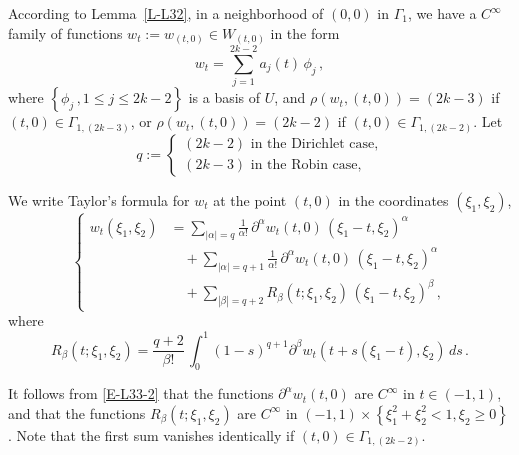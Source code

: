 \documentclass[12pt,a4paper]{amsart}
\theoremstyle{plain} %
\theoremstyle{definition}
\numberwithin{equation}{section}
\numberwithin{figure}{section}
\numberwithin{table}{section}
\newcommand{\set}[1]{\left\lbrace #1 \right\rbrace}
\begin{document}
According to Lemma~\ref{L-L32}, in a neighborhood  of $ (0,0)$ in $ \Gamma_1$, we have a $C^{\infty}$ family of functions $ w_t := w_{(t,0) }\in W_{(t,0)}$ in the form
%
\begin{equation}\label{E-L33-2}
w_t = \sum_{j=1}^{2k-2} a_j(t) \, \phi_j\,,
\end{equation}
%
where $\set{\phi_j\,, 1 \le j \le 2k-2}$ is a basis of $U$, and $\rho(w_t,(t,0)) = (2k-3)$ if $(t,0) \in \Gamma_{1,(2k-3)}$, or $\rho(w_t,(t,0)) = (2k-2)$ if $(t,0) \in \Gamma_{1,(2k-2)}$. Let
%
\begin{equation*}%
q := \left\{
        \begin{array}{l}
          (2k-2) \text{~in the Dirichlet case,}\\[5pt]
          (2k-3) \text{~in the Robin case,}
        \end{array}
      \right.
\end{equation*}

We write Taylor's formula for $w_t$ at the point $(t,0)$ in the coordinates $(\xi_1,\xi_2)$,
%
\begin{equation}\label{E-L33-6}
\left\{
\begin{array}{ll}
w_t(\xi_1,\xi_2) & = \sum_{|\alpha| = q} \frac{1}{\alpha!} \, \partial^{\alpha}w_t(t,0) \, \left( \xi_1 - t, \xi_2\right)^{\alpha}\\[5pt]
&\quad  + \sum_{|\alpha| = q+1} \frac{1}{\alpha!} \, \partial^{\alpha}w_t(t,0) \, \left( \xi_1 - t, \xi_2\right)^{\alpha}\\[5pt]
&\quad  + \sum_{|\beta| = q+2} R_{\beta}(t;\xi_1,\xi_2)\, \left( \xi_1 - t, \xi_2\right)^{\beta}\,,
\end{array}
\right.
\end{equation}
%
where
%
\begin{equation*}
R_{\beta}(t;\xi_1,\xi_2) = \frac{q+2}{\beta!} \,\int_0^1 (1-s)^{q+1} \partial^{\beta}w_t\left( t + s(\xi_1-t),\xi_2\right) \, ds\,.
\end{equation*}

It follows from \eqref{E-L33-2} that the functions $\partial^{\alpha}w_t(t,0)$ are $C^{\infty}$ in $t \in (-1,1)$, and that the functions $R_{\beta}(t;\xi_1,\xi_2)$ are $C^{\infty}$ in $(-1,1)\times \set{\xi_1^2+\xi_2^2 < 1, \xi_2\ge 0}$. Note that the first sum vanishes identically if $(t,0) \in \Gamma_{1,(2k-2)}$.\medskip
\end{document}
